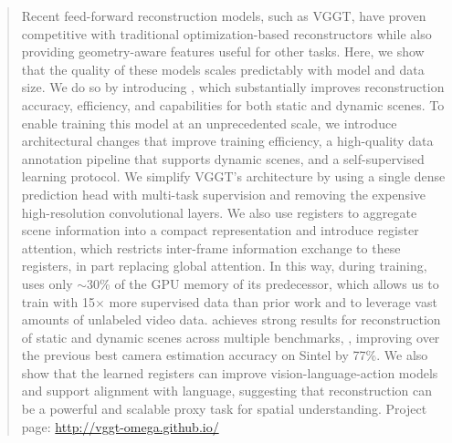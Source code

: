 \begin{abstract}
Recent feed-forward reconstruction models, such as VGGT, have proven competitive with traditional optimization-based reconstructors while also providing geometry-aware features useful for other tasks.
Here, we show that the quality of these models scales predictably with model and data size.
We do so by introducing \methodit, which substantially improves reconstruction accuracy, efficiency, and capabilities for both static and dynamic scenes.
To enable training this model at an unprecedented scale, we introduce architectural changes that improve training efficiency, a high-quality data annotation pipeline that supports dynamic scenes, and a self-supervised learning protocol.
We simplify VGGT's architecture by using a single dense prediction head with multi-task supervision and removing the expensive high-resolution convolutional layers.
We also use registers to aggregate scene information into a compact representation and introduce register attention, which restricts inter-frame information exchange to these registers, in part replacing global attention.
In this way, during training, \methodit uses only $\sim$30\% of the GPU memory of its predecessor, which allows us to train \methodit with 15$\times$ more supervised data than prior work and to leverage vast amounts of unlabeled video data.
\methodit achieves strong results for reconstruction of static and dynamic scenes across multiple benchmarks, \eg, improving over the previous best camera estimation accuracy on Sintel by 77\%.
We also show that the learned registers can improve vision-language-action models and support alignment with language, suggesting that reconstruction can be a powerful and scalable proxy task for spatial understanding. 
% 
Project page: \url{http://vggt-omega.github.io/}
\end{abstract}




